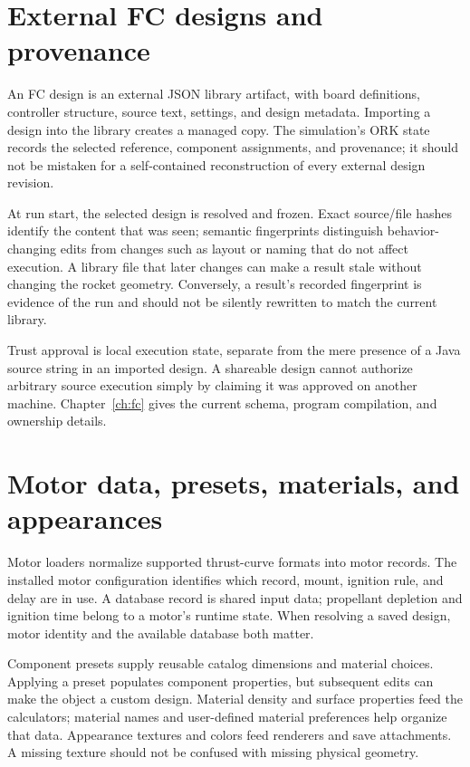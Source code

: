 \section{External FC designs and provenance}
An FC design is an external JSON library artifact, with board definitions, controller structure, source text, settings, and design metadata. Importing a design into the library creates a managed copy. The simulation's ORK state records the selected reference, component assignments, and provenance; it should not be mistaken for a self-contained reconstruction of every external design revision.

At run start, the selected design is resolved and frozen. Exact source/file hashes identify the content that was seen; semantic fingerprints distinguish behavior-changing edits from changes such as layout or naming that do not affect execution. A library file that later changes can make a result stale without changing the rocket geometry. Conversely, a result's recorded fingerprint is evidence of the run and should not be silently rewritten to match the current library.

Trust approval is local execution state, separate from the mere presence of a Java source string in an imported design. A shareable design cannot authorize arbitrary source execution simply by claiming it was approved on another machine. Chapter~\ref{ch:fc} gives the current schema, program compilation, and ownership details.

\section{Motor data, presets, materials, and appearances}
Motor loaders normalize supported thrust-curve formats into motor records. The installed motor configuration identifies which record, mount, ignition rule, and delay are in use. A database record is shared input data; propellant depletion and ignition time belong to a motor's runtime state. When resolving a saved design, motor identity and the available database both matter.

Component presets supply reusable catalog dimensions and material choices. Applying a preset populates component properties, but subsequent edits can make the object a custom design. Material density and surface properties feed the calculators; material names and user-defined material preferences help organize that data. Appearance textures and colors feed renderers and save attachments. A missing texture should not be confused with missing physical geometry.

